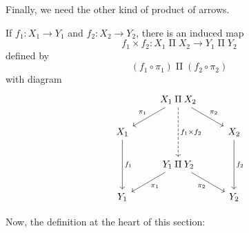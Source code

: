 \documentclass[a5paper]{scrartcl}
\newcommand{\PI}{\mathbin{\Pi}}
\begin{document}
Finally, we need the other kind of product of arrows.
\begin{defn}
  If \(f_1: X_1 \to Y_1\) and \(f_2: X_2 \to Y_2\), there is an induced map
  \[
    f_1\times f_2 : X_1 \PI X_2 \to Y_1 \PI Y_2
  \]
  defined by
  \[
    (f_1\circ \pi_1) \PI (f_2\circ \pi_2)
  \]
  with diagram
  \[
    \begin{tikzcd}
      & X_1 \PI X_2 \ar[swap,"\pi_1"]{dl}\ar["\pi_2"]{dr}\ar[dashed,"f_1\times f_2"]{dd} \\
      X_1\ar["f_1"]{dd} & & X_2 \ar["f_2"]{dd}\\
      & Y_1 \PI Y_2\ar["\pi_1"]{dl}\ar[swap,"\pi_2"]{dr} \\
      Y_1 & & Y_2
    \end{tikzcd}
  \]
\end{defn}
Now, the definition at the heart of this section:
\end{document}
